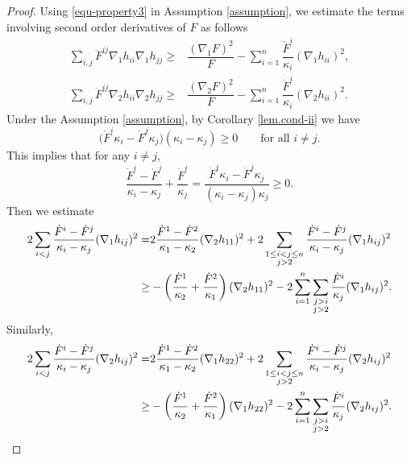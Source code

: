 \documentclass[10pt,a4paper]{amsart}
\begin{document}
\begin{proof}
  Using \eqref{equ-property3} in Assumption \ref{assumption}, we estimate the terms involving second order derivatives of $F$ as follows 
    \begin{align}
        \sum\limits_{i,j} \ddot{F}^{ij}\nabla_1 h_{ii}\nabla_1 h_{jj}\geq &\dfrac{(\nabla_1 F)^2}{F} - \sum\limits_{i=1}^n \dfrac{\dot{F}^i}{\kappa_i}(\nabla_1 h_{ii})^2,\label{s3.d2F}\\
          \sum\limits_{i,j} \ddot{F}^{ij}\nabla_2 h_{ii}\nabla_2 h_{jj}\geq &\dfrac{(\nabla_2 F)^2}{F} - \sum\limits_{i=1}^n \dfrac{\dot{F}^i}{\kappa_i}(\nabla_2 h_{ii})^2. \label{s3.d2Fb}
    \end{align}
Under the Assumption \ref{assumption}, by Corollary \ref{lem.cond-ii} we have
\[
 \big(\dot F^i\kappa_i-\dot F^j\kappa_j\big)(\kappa_i-\kappa_j)\ge 0
\qquad \text{for all } i\neq j.   
\]
This implies that for any $i\neq j$,
    \begin{equation*}
    	\dfrac{\dot{F}^i-\dot{F}^j}{\kappa_i - \kappa_j} + \dfrac{\dot{F}^i}{\kappa_j}=\dfrac{\dot{F}^i\kappa_i-\dot{F}^j\kappa_j}{(\kappa_i-\kappa_j)\kappa_j} \geq 0.%
    \end{equation*}
    Then we estimate
    \begin{align}
    	2 \sum\limits_{i<j} \dfrac{\dot{F}^i - \dot{F}^j}{\kappa_i-\kappa_j}(\nabla_1 h_{ij})^2
    	=& 2\dfrac{\dot{F}^1-\dot{F}^2}{\kappa_1-\kappa_2}(\nabla_2 h_{11})^2 + 2 \sum\limits_{\substack{1\leq i<j\leq n\\j>2}}\dfrac{\dot{F}^i -\dot{F}^j}{\kappa_i -\kappa_j}(\nabla_1 h_{ij})^2 \notag\\
    	\geq& -\left(\dfrac{\dot{F}^1}{\kappa_2}+\dfrac{\dot{F}^2}{\kappa_1}\right)(\nabla_2 h_{11})^2 - 2 \sum\limits_{i=1}^n\sum\limits_{\substack{j>i\\j>2}}\dfrac{\dot{F}^i}{\kappa_j}(\nabla_1 h_{ij})^2.
    	\label{equ-estd1}
    \end{align}
    Similarly,
    \begin{align}
    	2 \sum\limits_{i<j} \dfrac{\dot{F}^i - \dot{F}^j}{\kappa_i-\kappa_j}(\nabla_2 h_{ij})^2 	=& 2\dfrac{\dot{F}^1-\dot{F}^2}{\kappa_1-\kappa_2}(\nabla_1 h_{22})^2 + 2 \sum\limits_{\substack{1\leq i<j\leq n\\j>2}}\dfrac{\dot{F}^i -\dot{F}^j}{\kappa_i -\kappa_j}(\nabla_2 h_{ij})^2 \notag\\
    	\geq& -\left(\dfrac{\dot{F}^1}{\kappa_2}+\dfrac{\dot{F}^2}{\kappa_1}\right)(\nabla_1 h_{22})^2 - 2 \sum\limits_{i=1}^n\sum\limits_{\substack{j>i\\j>2}}\dfrac{\dot{F}^i}{\kappa_j}(\nabla_2 h_{ij})^2.

\end{align}
\end{proof}
\end{document}
